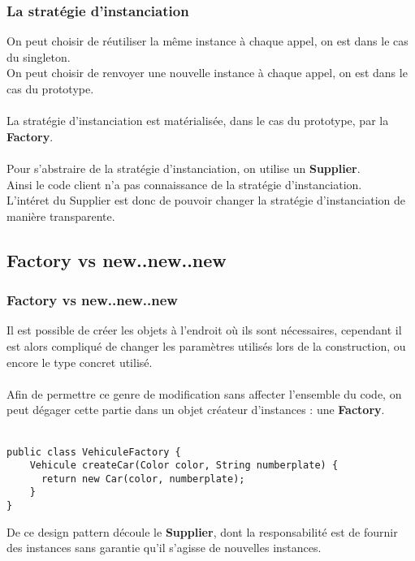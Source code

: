 \begin{frame}[fragile]
	\frametitle{La strat\'{e}gie d'instanciation}

   On peut choisir de r\'{e}utiliser la m\^{e}me instance \`{a} chaque appel, on est dans le cas du singleton.
   \\
   On peut choisir de renvoyer une nouvelle instance \`{a} chaque appel, on est dans le cas du prototype.
   \\~\\
    La strat\'{e}gie d'instanciation est mat\'{e}rialis\'{e}e, dans le cas du prototype, par la \textbf{Factory}.
    \\~\\
    Pour s'abstraire de la strat\'{e}gie d'instanciation, on utilise un \textbf{Supplier}.
    \\
    Ainsi le code client n'a pas connaissance de la strat\'{e}gie d'instanciation.
    \\
    L'int\'{e}ret du Supplier est donc de pouvoir changer la strat\'{e}gie d'instanciation de mani\`{e}re transparente.
\end{frame}

\subsection{Factory vs new..new..new}
\begin{frame}[fragile]
	\frametitle{Factory vs new..new..new}

    Il est possible de cr\'{e}er les objets \`{a} l'endroit o\`{u} ils sont n\'{e}cessaires, cependant il est alors compliqu\'{e} de changer les param\`{e}tres utilis\'{e}s lors de la construction, ou encore le type concret utilis\'{e}.
    \\~\\
    Afin de permettre ce genre de modification sans affecter l'ensemble du code, on peut d\'{e}gager cette partie dans un objet cr\'{e}ateur d'instances : une \textbf{Factory}.
    \\~\\
    \begin{lstlisting}
public class VehiculeFactory {
	Vehicule createCar(Color color, String numberplate) {
      return new Car(color, numberplate);
    }
}
	\end{lstlisting}

    De ce design pattern d\'{e}coule le \textbf{Supplier}, dont la responsabilit\'{e} est de fournir des instances sans garantie qu'il s'agisse de nouvelles instances.
\end{frame}

